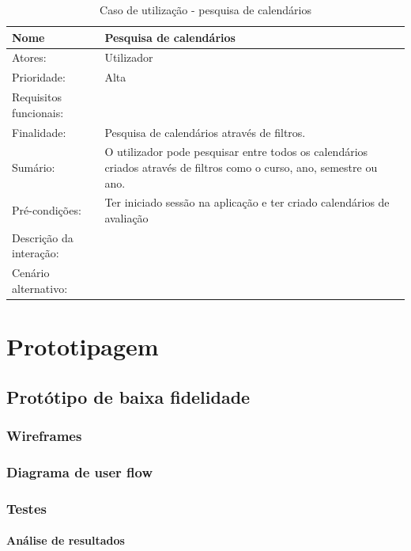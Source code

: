 \documentclass[11pt, twoside]{report}
\begin{document}
	
	

\begin{table}[H]
	\caption{Caso de utilização - pesquisa de calendários}
	\begin{center}	
		\begin{tabularx}{\textwidth}{|l|X|}
			\hline
			\textbf{Nome }	& \textbf{Pesquisa de calendários} \\
			\hline
			Atores: & Utilizador\\
			\hline
			Prioridade: &  Alta\\
			\hline
			Requisitos funcionais:&  \\
			\hline
			Finalidade: & Pesquisa de calendários através de filtros.\\
			\hline
			Sumário: & O utilizador pode pesquisar entre todos os calendários criados através de filtros como o curso, ano, semestre ou ano.\\
			\hline
			Pré-condições: & Ter iniciado sessão na aplicação e ter criado calendários de avaliação\\
			\hline
			Descrição da interação: &  \\
			\hline
			Cenário alternativo: &\\
			\hline
		\end{tabularx}
	\end{center}
\end{table}


	
	\chapter{Prototipagem}
	\section{Protótipo de baixa fidelidade}
	\subsection{Wireframes}
	\subsection{Diagrama de user flow}
	\subsection{Testes}
	\subsubsection{Análise de resultados}
	
\end{document}
